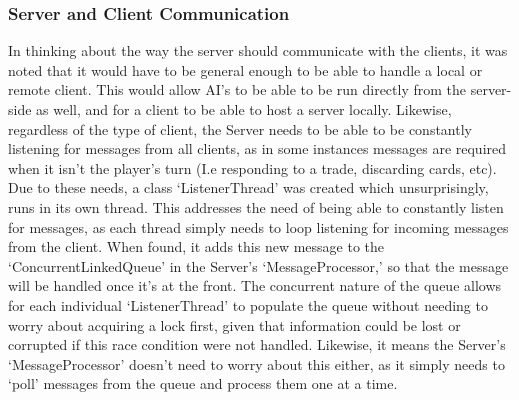 \documentclass[a4paper,doc,draftfirst]{apa6}
\begin{document}
\subsubsection{Server and Client Communication}
In thinking about the way the server should communicate with the clients, it was noted that it would have to be general enough to be able to handle a local or remote client. This would allow AI’s to be able to be run directly from the server-side as well, and for a client to be able to host a server locally. Likewise, regardless of the type of client, the Server needs to be able to be constantly listening for messages from all clients, as in some instances messages are required when it isn’t the player’s turn (I.e responding to a trade, discarding cards, etc). Due to these needs, a class ‘ListenerThread’ was created which unsurprisingly, runs in its own thread. This addresses the need of being able to constantly listen for messages, as each thread simply needs to loop listening for incoming messages from the client. When found, it adds this new message to the ‘ConcurrentLinkedQueue’ in the Server’s ‘MessageProcessor,’ so that the message will be handled once it’s at the front. The concurrent nature of the queue allows for each individual ‘ListenerThread’ to populate the queue without needing to worry about acquiring a lock first, given that information could be lost or corrupted if this race condition were not handled. Likewise, it means the Server’s ‘MessageProcessor’ doesn’t need to worry about this either, as it simply needs to ‘poll’ messages from the queue and process them one at a time.
\end{document}
